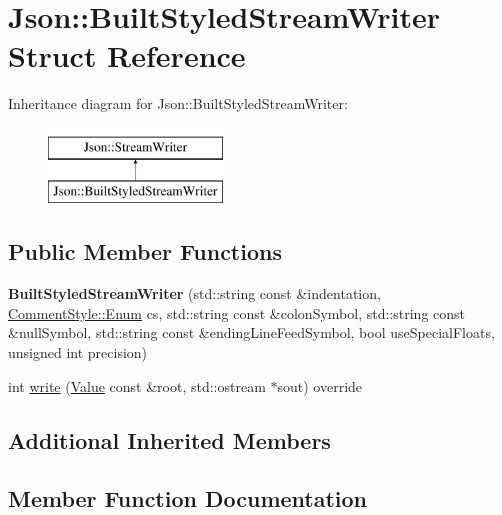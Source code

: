 \hypertarget{struct_json_1_1_built_styled_stream_writer}{}\section{Json\+:\+:Built\+Styled\+Stream\+Writer Struct Reference}
\label{struct_json_1_1_built_styled_stream_writer}
Inheritance diagram for Json\+:\+:Built\+Styled\+Stream\+Writer\+:\begin{figure}[H]
\begin{center}
\leavevmode
\includegraphics[height=2.000000cm]{struct_json_1_1_built_styled_stream_writer}
\end{center}
\end{figure}
\subsection*{Public Member Functions}
\begin{DoxyCompactItemize}
\item 
\mbox{\label{struct_json_1_1_built_styled_stream_writer_ab0c2e665c86b22f8fafb0e52c8069954}} 
{\bfseries Built\+Styled\+Stream\+Writer} (std\+::string const \&indentation, \hyperlink{struct_json_1_1_comment_style_a51fc08f3518fd81eba12f340d19a3d0c}{Comment\+Style\+::\+Enum} cs, std\+::string const \&colon\+Symbol, std\+::string const \&null\+Symbol, std\+::string const \&ending\+Line\+Feed\+Symbol, bool use\+Special\+Floats, unsigned int precision)
\item 
int \hyperlink{struct_json_1_1_built_styled_stream_writer_a2ecffc3d66c4feddf208e5cd3b1c0f18}{write} (\hyperlink{class_json_1_1_value}{Value} const \&root, std\+::ostream $\ast$sout) override
\end{DoxyCompactItemize}
\subsection*{Additional Inherited Members}


\subsection{Member Function Documentation}
\mbox{\label{struct_json_1_1_built_styled_stream_writer_a2ecffc3d66c4feddf208e5cd3b1c0f18}} 
